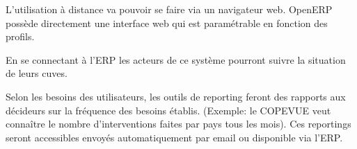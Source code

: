 L'utilisation à distance va pouvoir se faire via un navigateur web. OpenERP
possède directement une interface web qui est paramétrable en fonction des
profils.

En se connectant à l'ERP les acteurs de ce système pourront suivre la
situation de leurs cuves.

Selon les besoins des utilisateurs, les outils de reporting feront des
rapports aux décideurs sur la fréquence des besoins établis. (Exemple: le
COPEVUE veut connaître le nombre d'interventions faites par pays tous les
mois). Ces reportings seront accessibles envoyés automatiquement par email
ou disponible via l'ERP. 
